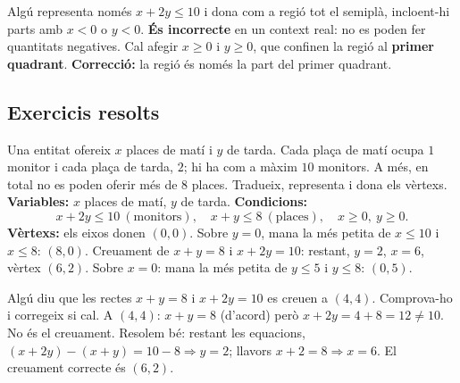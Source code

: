\begin{exemple}
Algú representa només $x+2y\le 10$ i dona com a regió tot el semiplà, incloent-hi
parts amb $x<0$ o $y<0$. \textbf{És incorrecte} en un context real: no es poden fer
quantitats negatives. Cal afegir $x\ge 0$ i $y\ge 0$, que confinen la regió al
\textbf{primer quadrant}. \textbf{Correcció:} la regió és només la part del primer
quadrant.
\end{exemple}

\subsection{Exercicis resolts}

\begin{exresolt}
Una entitat ofereix $x$ places de matí i $y$ de tarda. Cada plaça de matí ocupa $1$
monitor i cada plaça de tarda, $2$; hi ha com a màxim $10$ monitors. A més, en total
no es poden oferir més de $8$ places. Tradueix, representa i dona els vèrtexs.
\solucio
\textbf{Variables:} $x$ places de matí, $y$ de tarda. \textbf{Condicions:}
\[
x+2y\le 10 \ (\text{monitors}),\quad x+y\le 8 \ (\text{places}),\quad x\ge 0,\ y\ge 0.
\]
\textbf{Vèrtexs:} els eixos donen $(0,0)$. Sobre $y=0$, mana la més petita de
$x\le 10$ i $x\le 8$: $(8,0)$. Creuament de $x+y=8$ i $x+2y=10$: restant, $y=2$,
$x=6$, vèrtex $(6,2)$. Sobre $x=0$: mana la més petita de $y\le 5$ i $y\le 8$:
$(0,5)$.

\begin{center}
\end{center}
\end{exresolt}

\begin{exresolt}
Algú diu que les rectes $x+y=8$ i $x+2y=10$ es creuen a $(4,4)$. Comprova-ho i
corregeix si cal.
\solucio
A $(4,4)$: $x+y=8$ (d'acord) però $x+2y=4+8=12\neq 10$. No és el creuament. Resolem
bé: restant les equacions, $(x+2y)-(x+y)=10-8\Rightarrow y=2$; llavors $x+2=8\Rightarrow
x=6$. El creuament correcte és $(6,2)$.
\end{exresolt}

